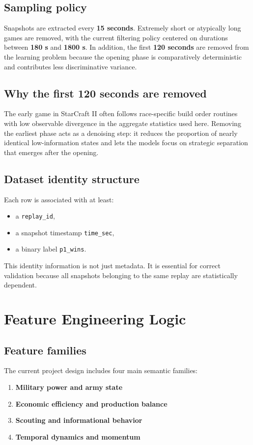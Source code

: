 \documentclass[11pt,a4paper]{article}
\begin{document}
	\subsection{Sampling policy}
	Snapshots are extracted every \textbf{15 seconds}. Extremely short or atypically long games are removed, with the current filtering policy centered on durations between \textbf{180 s} and \textbf{1800 s}. In addition, the first \textbf{120 seconds} are removed from the learning problem because the opening phase is comparatively deterministic and contributes less discriminative variance.
	
	\subsection{Why the first 120 seconds are removed}
	The early game in StarCraft II often follows race-specific build order routines with low observable divergence in the aggregate statistics used here. Removing the earliest phase acts as a denoising step: it reduces the proportion of nearly identical low-information states and lets the models focus on strategic separation that emerges after the opening.
	
	\subsection{Dataset identity structure}
	Each row is associated with at least:
	\begin{itemize}
		\item a \texttt{replay\_id},
		\item a snapshot timestamp \texttt{time\_sec},
		\item a binary label \texttt{p1\_wins}.
	\end{itemize}
	This identity information is not just metadata. It is essential for correct validation because all snapshots belonging to the same replay are statistically dependent.
	
	\section{Feature Engineering Logic}
	\subsection{Feature families}
	The current project design includes four main semantic families:
	\begin{enumerate}
		\item \textbf{Military power and army state}
		\item \textbf{Economic efficiency and production balance}
		\item \textbf{Scouting and informational behavior}
		\item \textbf{Temporal dynamics and momentum}
	\end{enumerate}
	
\end{document}

